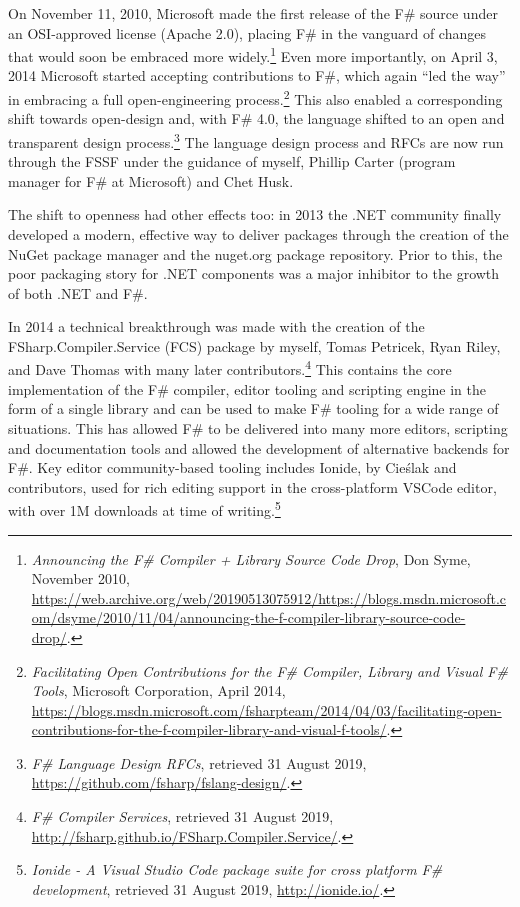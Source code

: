 \documentclass[acmsmall,review]{acmart}\settopmatter{printfolios=true,printccs=false,printacmref=false}
\begin{document}
On November 11, 2010, Microsoft made the first release of the F\# source under an OSI-approved
license (Apache 2.0), placing F\# in the vanguard of changes that would soon be embraced more widely.\footnote{\textit{Announcing the F\# Compiler + Library Source Code Drop}, Don Syme, November 2010, \url{https://web.archive.org/web/20190513075912/https://blogs.msdn.microsoft.com/dsyme/2010/11/04/announcing-the-f-compiler-library-source-code-drop/}.}
Even more importantly, on April 3, 2014 Microsoft started accepting contributions to F\#, which again “led the way” in embracing
a full open-engineering process.\footnote{\textit{Facilitating Open Contributions for the F\# Compiler, Library and Visual F\# Tools}, Microsoft Corporation, April 2014, \url{https://blogs.msdn.microsoft.com/fsharpteam/2014/04/03/facilitating-open-contributions-for-the-f-compiler-library-and-visual-f-tools/}.}
This also enabled a corresponding shift towards open-design and, with F\# 4.0, the
language shifted to an open and transparent design process.\footnote{\textit{F\# Language Design RFCs}, retrieved 31 August 2019, \url{https://github.com/fsharp/fslang-design/}.}
The language design process and RFCs are now run through the FSSF under the guidance of myself, Phillip Carter (program manager for F\# at Microsoft) and Chet Husk.

The shift to openness had other effects too: in 2013 the .NET community finally developed a modern, effective way to
deliver packages through the creation of the NuGet package manager and the nuget.org package repository.  Prior to
this, the poor packaging story for .NET components was a major inhibitor to the growth of both .NET and F\#.  

In 2014 a technical breakthrough was made with the creation of the FSharp.Compiler.Service (FCS) package by
myself, Tomas Petricek, Ryan Riley, and Dave Thomas with many later contributors.\footnote{\textit{F\# Compiler Services}, retrieved 31
August 2019, \url{http://fsharp.github.io/FSharp.Compiler.Service/}.}
This contains the core implementation of the F\# compiler, editor tooling and scripting engine in the form of a single library and can be used to make F\# tooling
for a wide range of situations.  This has allowed F\# to be delivered into many more editors, scripting and documentation
tools and allowed the development of alternative backends for F\#.   Key editor community-based tooling includes
Ionide, by Cieślak and contributors, used for rich editing support in the cross-platform VSCode editor, with over 1M downloads at time
of writing.\footnote{\textit{Ionide - A Visual Studio Code package suite for cross platform F\# development}, retrieved 31 August 2019, \url{http://ionide.io/}.}
\end{document}
